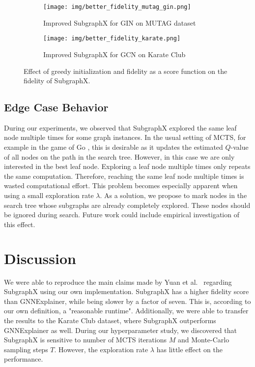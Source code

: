 \begin{figure}[ht]
  \begin{subfigure}{0.5\textwidth}
    \texttt{[image: img/better\_fidelity\_mutag\_gin.png]}
    \caption{Improved SubgraphX for GIN on MUTAG dataset}
  \end{subfigure}%
  \hspace*{\fill}   %
  \begin{subfigure}{0.5\textwidth}
    \texttt{[image: img/better\_fidelity\_karate.png]}
    \caption{Improved SubgraphX for GCN on Karate Club}
  \end{subfigure}%
\caption{Effect of greedy initialization and fidelity as a score function on the fidelity of SubgraphX.} 
\label{fig:better}
\end{figure}


\subsection{Edge Case Behavior}
During our experiments, we observed that SubgraphX explored the same leaf node multiple times for some graph instances. 
In the usual setting of MCTS, for example in the game of Go \cite{silver16}, this is desirable as it updates the estimated $Q$-value of all nodes on the path in the search tree. 
However, in this case we are only interested in the best leaf node.
Exploring a leaf node multiple times only repeats the same computation. 
Therefore, reaching the same leaf node multiple times is wasted computational effort. 
This problem becomes especially apparent when using a small exploration rate $\lambda$. 
As a solution, we propose to mark nodes in the search tree whose subgraphs are already completely explored. 
These nodes should be ignored during search.
Future work could include empirical investigation of this effect.




\section{Discussion}
We were able to reproduce the main claims made by Yuan et al.\ \cite{Yuan21} regarding SubgraphX using our own implementation.
SubgraphX has a higher fidelity score than GNNExplainer, while being slower by a factor of seven. This is, according to our own definition, a "reasonable runtime".
Additionally, we were able to transfer the results to the Karate Club dataset, where SubgraphX outperforms GNNExplainer as well. 
During our hyperparameter study, we discovered that SubgraphX is sensitive to number of MCTS iterations $M$ and Monte-Carlo sampling steps $T$. 
However, the exploration rate $\lambda$ has little effect on the performance.

